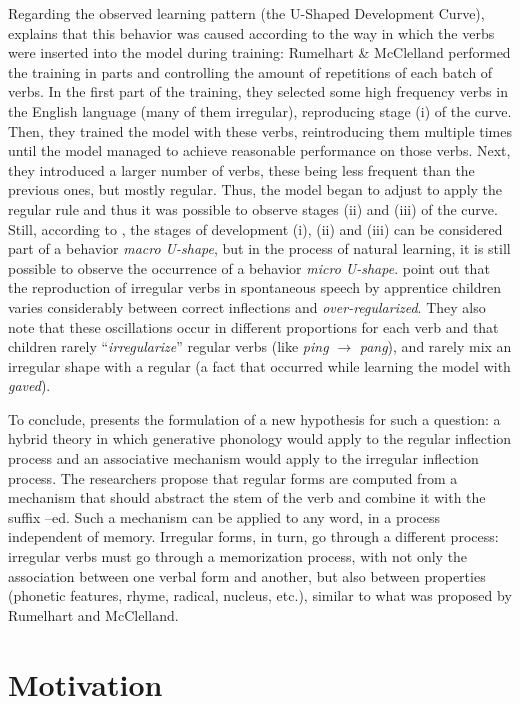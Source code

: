 Regarding the observed learning pattern (the U-Shaped Development Curve), \cite{Pinker:1999} explains that this behavior was caused according to the way in which the verbs were inserted into the model during training: Rumelhart \& McClelland performed the training in parts and controlling the amount of repetitions of each batch of verbs. In the first part of the training, they selected some high frequency verbs in the English language (many of them irregular), reproducing stage (i) of the curve. Then, they trained the model with these verbs, reintroducing them multiple times until the model managed to achieve reasonable performance on those verbs. Next, they introduced a larger number of verbs, these being less frequent than the previous ones, but mostly regular. Thus, the model began to adjust to apply the regular rule and thus it was possible to observe stages (ii) and (iii) of the curve. Still, according to  \cite{pluket:1991}, the stages of development (i), (ii) and (iii) can be considered part of a behavior \textit {macro U-shape}, but in the process of natural learning, it is still possible to observe the occurrence of a behavior \textit{micro U-shape}. \cite{pluket:1991} point out that the reproduction of irregular verbs in spontaneous speech by apprentice children varies considerably between correct inflections and \textit{over-regularized}. They also note that these oscillations occur in different proportions for each verb and that children rarely “\textit{irregularize}” regular verbs (like \textit{ping} $ \rightarrow $ \textit{pang}), and rarely mix an irregular shape with a regular (a fact that occurred while learning the model with \textit{gaved}).

To conclude, \cite{Pinker:1988} presents the formulation of a new hypothesis for such a question: a hybrid theory in which generative phonology would apply to the regular inflection process and an associative mechanism would apply to the irregular inflection process. The researchers propose that regular forms are computed from a mechanism that should abstract the stem of the verb and combine it with the suffix –ed. Such a mechanism can be applied to any word, in a process independent of memory. Irregular forms, in turn, go through a different process: irregular verbs must go through a memorization process, with not only the association between one verbal form and another, but also between properties (phonetic features, rhyme, radical, nucleus, etc.), similar to what was proposed by Rumelhart and McClelland.

\section{Motivation}
\label{sec:motivation}

